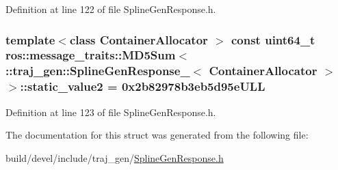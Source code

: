 Definition at line 122 of file Spline\+Gen\+Response.\+h.

\subsubsection[{\texorpdfstring{static\+\_\+value2}{static_value2}}]{\setlength{\rightskip}{0pt plus 5cm}template$<$class Container\+Allocator $>$ const uint64\+\_\+t ros\+::message\+\_\+traits\+::\+M\+D5\+Sum$<$ \+::{\bf traj\+\_\+gen\+::\+Spline\+Gen\+Response\+\_\+}$<$ Container\+Allocator $>$ $>$\+::static\+\_\+value2 = 0x2b82978b3eb5d95e\+U\+LL\hspace{0.3cm}{\ttfamily [static]}}\hypertarget{structros_1_1message__traits_1_1_m_d5_sum_3_01_1_1traj__gen_1_1_spline_gen_response___3_01_container_allocator_01_4_01_4_ace08c59898c3be7f735201515ce27e7c}{}\label{structros_1_1message__traits_1_1_m_d5_sum_3_01_1_1traj__gen_1_1_spline_gen_response___3_01_container_allocator_01_4_01_4_ace08c59898c3be7f735201515ce27e7c}


Definition at line 123 of file Spline\+Gen\+Response.\+h.



The documentation for this struct was generated from the following file\+:\begin{DoxyCompactItemize}
\item 
build/devel/include/traj\+\_\+gen/\hyperlink{_spline_gen_response_8h}{Spline\+Gen\+Response.\+h}\end{DoxyCompactItemize}
